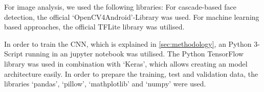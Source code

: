 For image analysis, we used the following libraries: For cascade-based face
detection, the official `OpenCV4Android'-Library was used\cite{opencv4android}.
For machine learning based approaches, the official TFLite library was utilised.
\cite{tensorflow}

In order to train the CNN, which is explained in \ref{sec:methodology}, an 
Python 3-Script running in an jupyter notebook was utilised. 
The Python TensorFlow library was used in combination with `Keras',
which allows creating an model architecture easily. In order to prepare the
training, test and validation data, the libraries `pandas', `pillow', 
`mathplotlib' and `numpy' were used.
